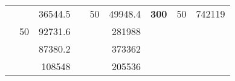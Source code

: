 \begin{table}[H]
\begin{tabular}{|ccrccrccc}
\rowcolor[HTML]{DDFDFF} 
\multicolumn{1}{|c|}{\cellcolor[HTML]{FFFFC7}}                                & \multicolumn{1}{c|}{\cellcolor[HTML]{DDFDFF}}                      & \multicolumn{1}{r|}{\cellcolor[HTML]{DAE8FC}36544.5}   & \multicolumn{1}{c|}{\cellcolor[HTML]{FFFFC7}}                                & \multicolumn{1}{c|}{\multirow{-10}{*}{\cellcolor[HTML]{DDFDFF}50}}  & \multicolumn{1}{r|}{\cellcolor[HTML]{DDFDFF}49948.4}   & \multicolumn{1}{c|}{\multirow{-19}{*}{\cellcolor[HTML]{FFFFC7}\textbf{300}}} & \multicolumn{1}{c|}{\multirow{-10}{*}{\cellcolor[HTML]{DDFDFF}50}} & \multicolumn{1}{r|}{\cellcolor[HTML]{DDFDFF}742119}    \\ \cline{3-3} \cline{5-9} 
\multicolumn{1}{|c|}{\cellcolor[HTML]{FFFFC7}}                                & \multicolumn{1}{c|}{\multirow{-10}{*}{\cellcolor[HTML]{DDFDFF}50}} & \multicolumn{1}{r|}{\cellcolor[HTML]{DDFDFF}92731.6}   & \multicolumn{1}{c|}{\cellcolor[HTML]{FFFFC7}}                                & \multicolumn{1}{c|}{\cellcolor[HTML]{DAE8FC}}                       & \multicolumn{1}{r|}{\cellcolor[HTML]{DAE8FC}281988}    &                                                                              &                                                                    &                                                        \\ \cline{2-3} \cline{6-6}
\multicolumn{1}{|c|}{\cellcolor[HTML]{FFFFC7}}                                & \multicolumn{1}{c|}{\cellcolor[HTML]{DAE8FC}}                      & \multicolumn{1}{r|}{\cellcolor[HTML]{DAE8FC}87380.2}   & \multicolumn{1}{c|}{\cellcolor[HTML]{FFFFC7}}                                & \multicolumn{1}{c|}{\cellcolor[HTML]{DAE8FC}}                       & \multicolumn{1}{r|}{\cellcolor[HTML]{DDFDFF}373362}    &                                                                              &                                                                    &                                                        \\ \cline{3-3} \cline{6-6}
\multicolumn{1}{|c|}{\cellcolor[HTML]{FFFFC7}}                                & \multicolumn{1}{c|}{\cellcolor[HTML]{DAE8FC}}                      & \multicolumn{1}{r|}{\cellcolor[HTML]{DDFDFF}108548}    & \multicolumn{1}{c|}{\cellcolor[HTML]{FFFFC7}}                                & \multicolumn{1}{c|}{\cellcolor[HTML]{DAE8FC}}                       & \multicolumn{1}{r|}{\cellcolor[HTML]{DAE8FC}205536}    &                                                                              &                                                                    &                                                        \\ \cline{3-3} \cline{6-6}

\end{tabular}
\end{table}
